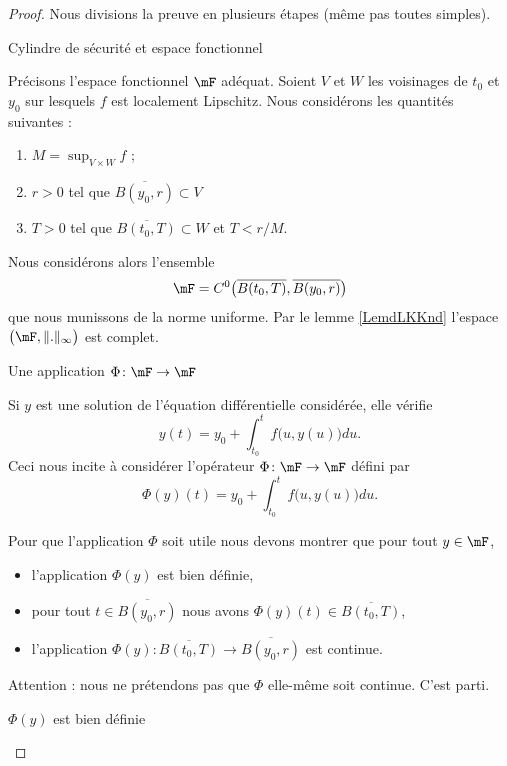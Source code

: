 \begin{proof}
    Nous divisions la preuve en plusieurs étapes (même pas toutes simples).
    \begin{subproof}
    \item[Cylindre de sécurité et espace fonctionnel]

    Précisons l'espace fonctionnel \( \mF\) adéquat. Soient \( V\) et \( W\) les voisinages de \( t_0\) et \( y_0\) sur lesquels \( f\) est localement Lipschitz. Nous considérons les quantités suivantes :
    \begin{enumerate}
        \item
            \( M=\sup_{V\times W}f\) ;
        \item
            \( r>0\) tel que \( \overline{ B(y_0,r) }\subset V\)
        \item
            \( T>0\) tel que \( \overline{ B(t_0,T) }\subset W\) et \( T<r/M\).
    \end{enumerate}
    Nous considérons alors l'ensemble
    \begin{equation}
        \mF=C^0\big( \overline{ B(t_0,T) },\overline{ B(y_0,r) } \big)
    \end{equation}
    que nous munissons de la norme uniforme. Par le lemme \ref{LemdLKKnd} l'espace \( \big( \mF,\| . \|_{\infty} \big)\) est complet.

    \item[Une application \( \Phi\colon \mF\to \mF\)]


    Si \( y\) est une solution de l'équation différentielle considérée, elle vérifie
    \begin{equation}        \label{EqPGLwcL}
        y(t)=y_0+\int_{t_0}^tf\big( u,y(u) \big)du.
    \end{equation}
    Ceci nous incite à considérer l'opérateur \( \Phi\colon \mF\to \mF\) défini par
    \begin{equation}
        \Phi(y)(t)=y_0+\int_{t_0}^tf\big( u,y(u) \big)du.
    \end{equation}

    Pour que l'application \( \Phi\) soit utile nous devons montrer que pour tout \( y\in \mF\),
    \begin{itemize}
        \item l'application \( \Phi(y)\) est bien définie,
        \item pour tout \( t\in\overline{ B(y_0,r) }\) nous avons \( \Phi(y)(t)\in\overline{ B(t_0,T) }\),
        \item l'application $\Phi(y)\colon    \overline{ B(t_0,T) }\to \overline{ B(y_0,r)} $ est continue.
    \end{itemize}
    Attention : nous ne prétendons pas que \( \Phi\) elle-même soit continue. C'est parti.
    \begin{subproof}
    \item[\( \Phi(y)\) est bien définie]
            

\end{subproof}
\end{subproof}
\end{proof}
